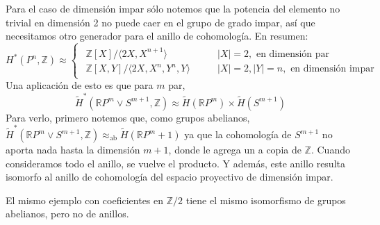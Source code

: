 \documentclass[spanish]{book}
\theoremstyle{definition}
\newcommand{\R}{\mathbb{R}}
\newcommand{\Z}{\mathbb{Z}}
\begin{document}
Para el caso de dimensión impar sólo notemos que la potencia del elemento no trivial en dimensión 2 no puede caer en el grupo de grado impar, así que necesitamos otro generador para el anillo de cohomología. En resumen:
\[H^*(P^n,\Z)\approx\begin{cases}
	\begin{aligned}
		\Z[X]/\langle2X,X^{n+1}\rangle\qquad\qquad&|X|=2,\text{ en dimensión par}\\
		\Z[X,Y]/\langle 2X,X^n,Y^n,Y\rangle\qquad&|X|=2,|Y|=n,\text{ en dimensión impar}
	\end{aligned}
\end{cases}\]
Una aplicación de esto es que para $m$ par,
\[\tilde{H}^*(\R P^m\vee S^{m+1},\Z)\approx\tilde{H}(\R P^m)\times\tilde{H}(S^{m+1})\]
Para verlo, primero notemos que, como grupos abelianos, $\tilde{H}^*(\R P^m\vee S^{m+1},\Z)\approx_{\text{ab}}\tilde{H}(\R P^m+1)$ ya que la cohomología de $S^{m+1}$ no aporta nada hasta la dimensión $m+1$, donde le agrega un a copia de $\Z$. Cuando consideramos todo el anillo, se vuelve el producto. Y además, este anillo resulta isomorfo al anillo de cohomología del espacio proyectivo de dimensión impar.

El mismo ejemplo con coeficientes en $\Z/2$ tiene el mismo isomorfismo de grupos abelianos, pero no de anillos.
\end{document}
